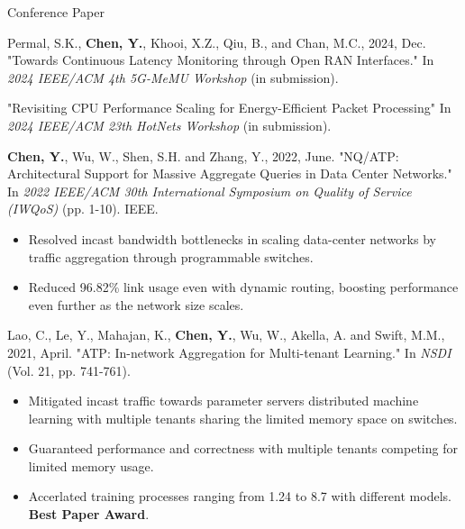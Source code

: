
\vspace{-2mm}

\begin{cventries}

  \cventry
    {} %
    {Conference Paper} %
    {} %
    {} %
    {
      \vspace{-2mm}
      \begin{cvitems} %
        \item {Permal, S.K., \textbf{Chen, Y.}, Khooi, X.Z., Qiu, B., and Chan, M.C., 2024, Dec. "Towards Continuous Latency Monitoring through Open RAN Interfaces." 
        In \emph{2024 IEEE/ACM 4th 5G-MeMU Workshop} (in submission).
        }
        \item {"Revisiting CPU Performance Scaling for Energy-Efficient Packet Processing" 
        In \emph{2024 IEEE/ACM 23th HotNets Workshop} (in submission).
        }
        \item {\textbf{Chen, Y.}, Wu, W., Shen, S.H. and Zhang, Y., 2022, June. "NQ/ATP: Architectural Support for Massive Aggregate Queries in Data Center Networks." 
        In \emph{2022 IEEE/ACM 30th International Symposium on Quality of Service (IWQoS)} (pp. 1-10). IEEE.
        }
        \begin{itemize}
          \item {Resolved incast bandwidth bottlenecks in scaling data-center networks by traffic aggregation through programmable switches.}
          \item {Reduced 96.82\% link usage even with dynamic routing, boosting performance even further as the network size scales.}
        \end{itemize}
        \item {Lao, C., Le, Y., Mahajan, K., \textbf{Chen, Y.}, Wu, W., Akella, A. and Swift, M.M., 2021, April. "ATP: In-network Aggregation for Multi-tenant Learning." 
        In \emph{NSDI} (Vol. 21, pp. 741-761).
        }
        \begin{itemize}
          \item{Mitigated incast traffic towards parameter servers distributed machine learning with multiple tenants sharing the limited memory space on switches.}
          \item {Guaranteed performance and correctness with multiple tenants competing for limited memory usage.}
          \item {Accerlated training processes ranging from 1.24 to 8.7 with different models. \textbf{Best Paper Award}.}
        \end{itemize}
      \end{cvitems}
    }
  \vspace{-2mm}


\end{cventries}
